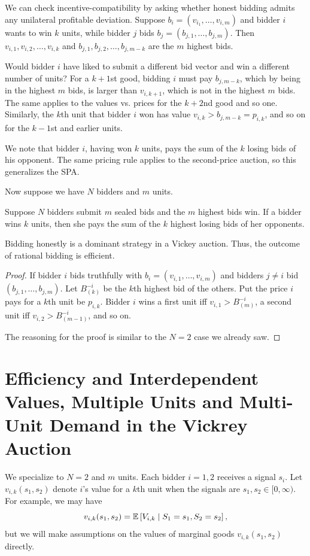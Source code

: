\begin{remark}
	We can check incentive-compatibility by asking whether honest bidding admits any unilateral profitable deviation.
	Suppose $b_i = \left( v_{i_1},\ldots,v_{i,m} \right)$ and bidder $i$ wants to win $k$ units, while bidder $j$ bids $b_j = \left( b_{j,1},\ldots,b_{j,m} \right)$.
	Then $v_{i,1},v_{i,2},\ldots,v_{i,k}$ and $b_{j,1},b_{j,2},\ldots,b_{j,m-k}$ are the $m$ highest bids.

	Would bidder $i$ have liked to submit a different bid vector and win a different number of units? For a $k+1$st good, bidding $i$ must pay $b_{j,m-k}$, which by being in the highest $m$ bids, is larger than $v_{i,k+1}$, which is not in the highest $m$ bids. The same applies to the values vs. prices for the $k+2$nd good and so one. Similarly, the $k$th unit that bidder $i$ won has value $v_{i,k} > b_{j,m-k} = p_{i,k}$, and so on for the $k-1$st and earlier units. 

	We note that bidder $i$, having won $k$ units, pays the sum of the $k$ losing bids of his opponent. The same pricing rule applies to the second-price auction, so this generalizes the SPA.
\end{remark}

Now suppose we have $N$ bidders and $m$ units. 
\begin{definition}
	Suppose $N$ bidders submit $m$ sealed bids and the $m$ highest bids win. If a bidder wins $k$ units, then she pays the sum of the $k$ highest losing bids of her opponents.
\end{definition}

\begin{theorem}
	Bidding honestly is a dominant strategy in a Vickey auction. Thus, the outcome of rational bidding is efficient.
\end{theorem}
\begin{proof}
	If bidder $i$ bids truthfully with $b_i = \left( v_{i,1},\ldots,v_{i,m} \right)$ and bidders $j \ne i$ bid $\left( b_{j,1},\ldots,b_{j,m} \right)$.
	Let $B^{-i}_{(k)}$ be the $k$th highest bid of the others. Put the price $i$ pays for a $k$th unit be $p_{i,k}$. Bidder $i$ wins a first unit iff $v_{i,1} > B^{-i}_{(m)}$, a second unit iff $v_{i,2} > B^{-i}_{(m-1)}$, and so on.

	The reasoning for the proof is similar to the $N = 2$ case we already saw.
\end{proof}

\section{Efficiency and Interdependent Values, Multiple Units and Multi-Unit Demand in the Vickrey Auction}
We specialize to $N=2$ and $m$ units. Each bidder $i=1,2$ receives a signal $s_i$. Let $v_{i,k}\left( s_1,s_2 \right)$ denote $i$'s value for a $k$th unit when the signals are $s_1,s_2 \in [0,\infty)$. For example, we may have \[
	v_{i,k}(s_1,s_2) = \mathbb{E}\left[V_{i,k} \mid S_1 = s_1,S_2 = s_2\right] 
,\] 
but we will make assumptions on the values of marginal goods $v_{i,k}(s_1,s_2)$ directly.

